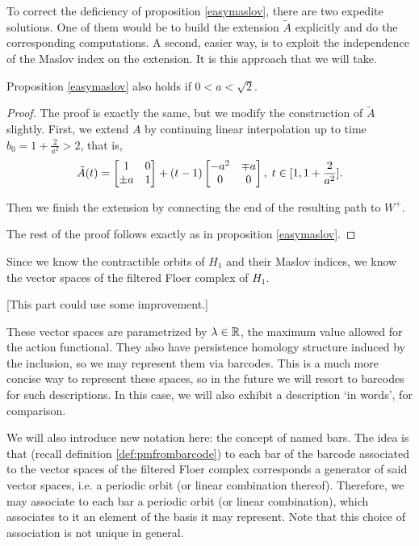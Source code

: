 To correct the deficiency of proposition \ref{easymaslov}, there are two expedite solutions. One of them would be to build the extension $\tilde A$ explicitly and do the corresponding computations. A second, easier way, is to exploit the independence of the Maslov index on the extension. It is this approach that we will take.

\begin{prop}
Proposition \ref{easymaslov} also holds if $0 < a < \sqrt2$.
\end{prop}

\begin{proof}
The proof is exactly the same, but we modify the construction of $\tilde A$ slightly. First, we extend $A$ by continuing linear interpolation up to time $b_0 = 1 + \frac2{a^2} > 2$, that is,
\begin{equation}
\tilde A(t) = \begin{bmatrix}
1 & 0\\
\pm a & 1
\end{bmatrix}
+
(t-1)
\begin{bmatrix}
- a^2 &  \mp a\\
0 & 0
\end{bmatrix}, \; t \in \interval1{1+\frac2{a^2}}.
\end{equation}

Then we finish the extension by connecting the end of the resulting path to $W^+$.

The rest of the proof follows exactly as in proposition \ref{easymaslov}.
\end{proof}

Since we know the contractible orbits of $H_1$ and their Maslov indices, we know the vector spaces of the filtered Floer complex of $H_1$.

[This part could use some improvement.]

These vector spaces are parametrized by $\lambda \in \mathbb{R}$, the maximum value allowed for the action functional. They also have persistence homology structure induced by the inclusion, so we may represent them via barcodes. This is a much more concise way to represent these spaces, so in the future we will resort to barcodes for such descriptions. In this case, we will also exhibit a description `in words', for comparison.

We will also introduce new notation here: the concept of named bars. The idea is that (recall definition \ref{def:pmfrombarcode}) to each bar of the barcode associated to the vector spaces of the filtered Floer complex corresponds a generator of said vector spaces, i.e. a periodic orbit (or linear combination thereof). Therefore, we may associate to each bar a periodic orbit (or linear combination), which associates to it an element of the basis it may represent. Note that this choice of association is not unique in general.

